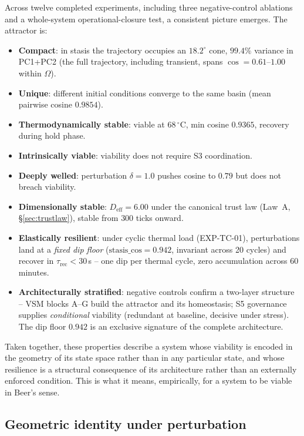 \documentclass[11pt, a4paper]{article}
\begin{document}
Across twelve completed experiments, including three negative-control ablations
and a whole-system operational-closure test, a consistent picture emerges.
The attractor is:
\begin{itemize}
  \item \textbf{Compact}: in stasis the trajectory occupies an $18.2^\circ$ cone,
        $99.4\%$ variance in PC1+PC2 (the full trajectory, including transient,
        spans $\cos = 0.61$--$1.00$ within $\Omega$).
  \item \textbf{Unique}: different initial conditions converge to the same basin
        (mean pairwise cosine $0.9854$).
  \item \textbf{Thermodynamically stable}: viable at $68\,^\circ\mathrm{C}$,
        min cosine $0.9365$, recovery during hold phase.
  \item \textbf{Intrinsically viable}: viability does not require S3 coordination.
  \item \textbf{Deeply welled}: perturbation $\delta = 1.0$ pushes cosine to $0.79$
        but does not breach viability.
  \item \textbf{Dimensionally stable}: $D_\text{eff} = 6.00$ under the canonical
        trust law (Law~A, \S\ref{sec:trustlaw}), stable from $300$ ticks onward.
  \item \textbf{Elastically resilient}: under cyclic thermal load (EXP-TC-01),
        perturbations land at a \emph{fixed dip floor} ($\text{stasis\_cos} =
        0.942$, invariant across 20 cycles) and recover in
        $\tau_\text{rec} < 30$\,s -- one dip per thermal cycle, zero
        accumulation across 60 minutes.
  \item \textbf{Architecturally stratified}: negative controls confirm a two-layer
        structure -- VSM blocks A--G build the attractor and its homeostasis; S5
        governance supplies \emph{conditional} viability (redundant at baseline,
        decisive under stress). The dip floor $0.942$ is an exclusive signature
        of the complete architecture.
\end{itemize}

Taken together, these properties describe a system whose viability is encoded
in the geometry of its state space rather than in any particular state, and
whose resilience is a structural consequence of its architecture rather than
an externally enforced condition.
This is what it means, empirically, for a system to be viable in Beer's sense.

\subsection{Geometric identity under perturbation}
\end{document}
